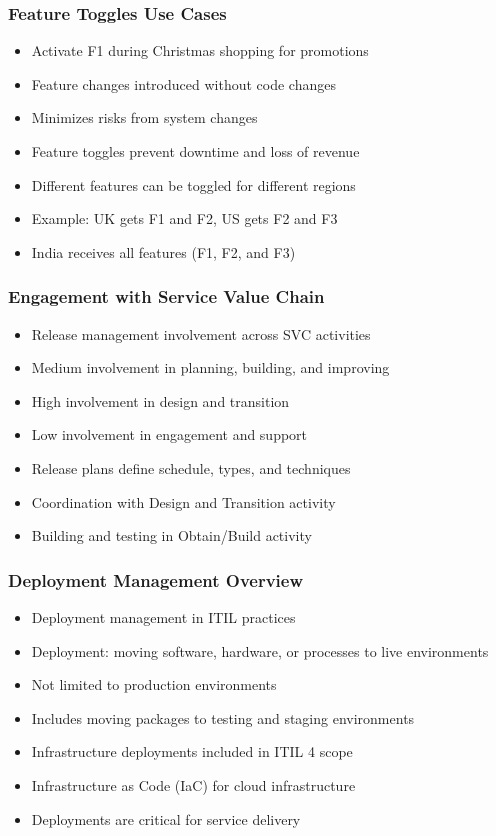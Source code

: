 \documentclass[aspectratio=169, table]{beamer}
\begin{document}
\begin{frame}
	\frametitle{Feature Toggles Use Cases}
	\begin{itemize}
		\item Activate F1 during Christmas shopping for promotions
		\item Feature changes introduced without code changes
		\item Minimizes risks from system changes
		\item Feature toggles prevent downtime and loss of revenue
		\item Different features can be toggled for different regions
		\item Example: UK gets F1 and F2, US gets F2 and F3
		\item India receives all features (F1, F2, and F3)
	\end{itemize}
\end{frame}

\begin{frame}
	\frametitle{Engagement with Service Value Chain}
	\begin{itemize}
		\item Release management involvement across SVC activities
		\item Medium involvement in planning, building, and improving
		\item High involvement in design and transition
		\item Low involvement in engagement and support
		\item Release plans define schedule, types, and techniques
		\item Coordination with Design and Transition activity
		\item Building and testing in Obtain/Build activity
	\end{itemize}
\end{frame}

\begin{frame}
	\frametitle{Deployment Management Overview}
	\begin{itemize}
		\item Deployment management in ITIL practices
		\item Deployment: moving software, hardware, or processes to live environments
		\item Not limited to production environments
		\item Includes moving packages to testing and staging environments
		\item Infrastructure deployments included in ITIL 4 scope
		\item Infrastructure as Code (IaC) for cloud infrastructure
		\item Deployments are critical for service delivery
	\end{itemize}
\end{frame}
\end{document}
